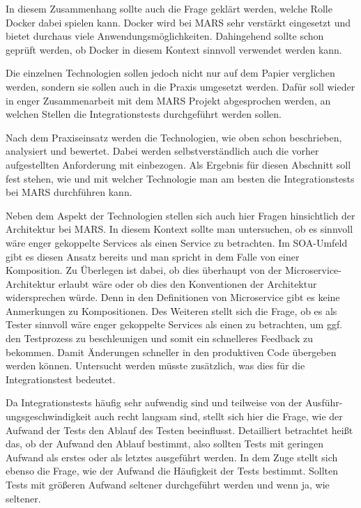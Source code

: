 \documentclass{llncs}
\begin{document}
In diesem Zusammenhang sollte auch die Frage geklärt werden, welche Rolle Docker dabei spielen kann. Docker wird bei MARS sehr verstärkt eingesetzt und bietet durchaus viele Anwendungsmöglichkeiten. Dahingehend sollte schon geprüft werden, ob Docker in diesem Kontext sinnvoll verwendet werden kann.

Die einzelnen Technologien sollen jedoch nicht nur auf dem Papier verglichen werden, sondern sie sollen auch in die Praxis umgesetzt werden. Dafür soll wieder in enger Zusammenarbeit mit dem MARS Projekt abgesprochen werden, an welchen Stellen die Integrationstests durchgeführt werden sollen.

Nach dem Praxiseinsatz werden die Technologien, wie oben schon beschrieben, analysiert und bewertet. Dabei werden selbstverständlich auch die vorher aufgestellten Anforderung mit einbezogen. Als Ergebnis für diesen Abschnitt soll fest stehen, wie und mit welcher Technologie man am besten die Integrationstests bei MARS durchführen kann.

Neben dem Aspekt der Technologien stellen sich auch hier Fragen hinsichtlich der Architektur bei MARS. In diesem Kontext sollte man untersuchen, ob es sinnvoll wäre enger gekoppelte Services als einen Service zu betrachten. Im SOA-Umfeld gibt es diesen Ansatz bereits und man spricht in dem Falle von einer Komposition. Zu Überlegen ist dabei, ob dies überhaupt von der Microservice-Architektur erlaubt wäre oder ob dies den Konventionen der Architektur widersprechen würde. Denn in den Definitionen von Microservice gibt es keine Anmerkungen zu Kompositionen. Des Weiteren stellt sich die Frage, ob es als Tester sinnvoll wäre enger gekoppelte Services als einen zu betrachten, um ggf. den Testprozess zu beschleunigen und somit ein schnelleres Feedback zu bekommen. Damit Änderungen schneller in den produktiven Code übergeben werden können. Untersucht werden müsste zusätzlich, was dies für die Integrationstest bedeutet. 

Da Integrationstests häufig sehr aufwendig sind und teilweise von der Ausführ-ungsgeschwindigkeit auch recht langsam sind, stellt sich hier die Frage, wie der Aufwand der Tests den Ablauf des Testen beeinflusst. Detailliert betrachtet heißt das, ob der Aufwand den Ablauf bestimmt, also sollten Tests mit geringen Aufwand als erstes oder als letztes ausgeführt werden. In dem Zuge stellt sich ebenso die Frage, wie der Aufwand die Häufigkeit der Tests bestimmt. Sollten Tests mit größeren Aufwand seltener durchgeführt werden und wenn ja, wie seltener.
\end{document}
